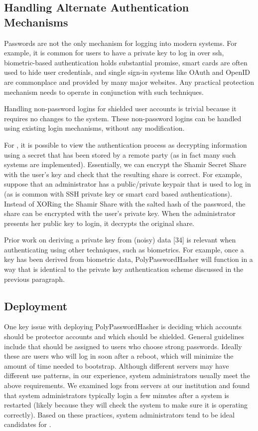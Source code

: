 \subsection{Handling Alternate Authentication Mechanisms}
\label{SUBSEC:alternate-authentication-mechanisms}

Passwords are not the only mechanism for logging into modern systems. For
example, it is common for users to have a private key to log in over ssh,
biometric-based authentication holds substantial promise, smart cards are often
used to hide user credentials, and single sign-in systems like OAuth and OpenID
are commonplace and provided by many major websites. Any practical protection
mechanism needs to operate in conjunction with such techniques.

Handling non-password logins for shielded user accounts is trivial because
it requires no changes to the system. These non-password logins can be handled
using existing login mechanisms, without any modification. 

For \thresholdaccounts, it is possible to view the authentication process as
decrypting information using a secret that has been stored by a remote party
(as in fact many such systems are implemented). Essentially, we can encrypt the
Shamir Secret Share with the user’s key and check that the resulting share is
correct.  For example, suppose that an administrator has a public/private
keypair that is used to log in (as is common with SSH private key or smart card
based authentications).  Instead of XORing the Shamir Share with the salted
hash of the password, the share can be encrypted with the user’s private key.
When the administrator presents her public key to login, it decrypts the
original share. 

Prior work on deriving a private key from (noisy) data [34] is relevant when
authenticating \thresholdaccounts using other techniques, such as biometrics.
For example, once a key has been derived from biometric data,
PolyPasswordHasher will function in a way that is identical to the private key
authentication scheme discussed in the previous paragraph. 

\subsection{Deployment}
\label{SUBSEC:deployment}

One key issue with deploying PolyPasswordHasher is deciding which accounts should be protector
accounts and which should be shielded.  General guidelines include that
\thresholdaccounts should be assigned to users who choose strong passwords.
Ideally these are users who will log in soon after a reboot, which will
minimize the amount of time needed to bootstrap. Although different servers may
have different use patterns, in our experience, system administrators usually
meet the above requirements.  We examined logs from servers at our institution
and found that system administrators typically login a few minutes after a
system is restarted (likely because they will check the system to make sure it
is operating correctly).  Based on these practices, system administrators tend
to be ideal candidates for \thresholdaccounts.

